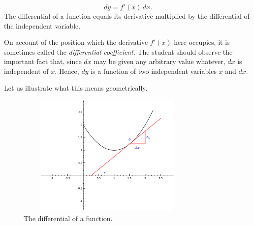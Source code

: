 \begin{equation}
dy = f'(x)\, dx.
\label{eqn:B-88}
\end{equation}
The differential of a function equals its derivative multiplied 
by the differential of the independent variable.

On account of the position 
which the derivative $f'(x)$ here occupies, it is sometimes called 
the {\it differential coefficient}. The student should observe the 
important fact that, since $dx$ may be given any arbitrary value 
whatever, $dx$ is independent of $x$. Hence, $dy$ is a function 
of two independent variables $x$ and $dx$.

Let us illustrate what this means geometrically.

\begin{figure}[h!]
\begin{minipage}{\textwidth}
\begin{center}
\includegraphics[height=6cm,width=9cm]{parabola-tangent3.eps}
\end{center}
\end{minipage}
\caption{The differential of a function.}
\label{fig:differential}
\end{figure}


